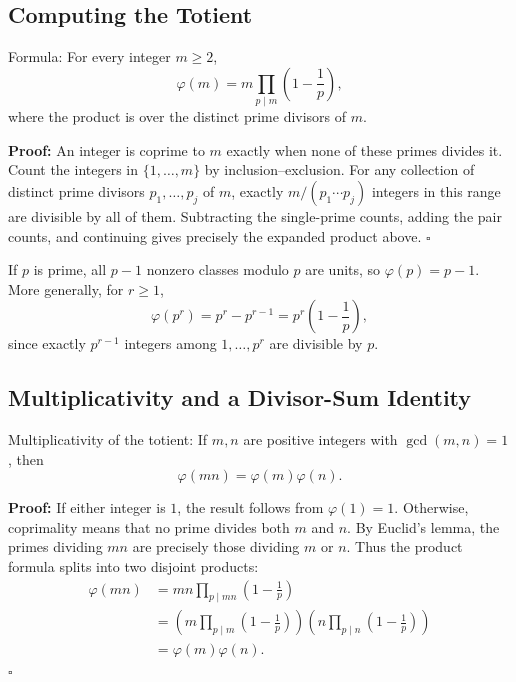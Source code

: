 \documentclass[a4paper,11pt,abstracton]{scrartcl}
\theoremstyle{dotlessP}
\theoremstyle{dotlessS}
\theoremstyle{remark}
\theoremstyle{definition}
\begin{document}
\subsection{Computing the Totient}

\begin{mainbox}{Formula:}
For every integer $m\geq2$,
\[
    \varphi(m)=m\prod_{p\mid m}\left(1-\frac1p\right),
\]
where the product is over the distinct prime divisors of $m$.
\end{mainbox}

\textbf{Proof:}
An integer is coprime to $m$ exactly when none of these primes divides
it. Count the integers in $\{1,\ldots,m\}$ by inclusion--exclusion.
For any collection of distinct prime divisors $p_1,\ldots,p_j$ of $m$,
exactly $m/(p_1\cdots p_j)$ integers in this range are divisible by
all of them. Subtracting the single-prime counts, adding the pair
counts, and continuing gives precisely the expanded product above.
\hfill$\square$

\begin{remark_box}
If $p$ is prime, all $p-1$ nonzero classes modulo $p$ are units, so
$\varphi(p)=p-1$. More generally, for $r\geq1$,
\[
    \varphi(p^r)=p^r-p^{r-1}=p^r\left(1-\frac1p\right),
\]
since exactly $p^{r-1}$ integers among $1,\ldots,p^r$ are divisible
by $p$.
\end{remark_box}


\subsection{Multiplicativity and a Divisor-Sum Identity}

\begin{mainbox}{Multiplicativity of the totient:}
If $m,n$ are positive integers with $\gcd(m,n)=1$, then
\[
    \boxed{\varphi(mn)=\varphi(m)\varphi(n).}
\]
\end{mainbox}

\textbf{Proof:}
If either integer is $1$, the result follows from $\varphi(1)=1$.
Otherwise, coprimality means that no prime divides both $m$ and $n$.
By Euclid's lemma, the primes dividing $mn$ are precisely those dividing
$m$ or $n$. Thus the product formula splits into two disjoint products:
\begin{align*}
    \varphi(mn)
    &=mn\prod_{p\mid mn}\left(1-\frac1p\right)\\
    &=\left(m\prod_{p\mid m}\left(1-\frac1p\right)\right)
      \left(n\prod_{p\mid n}\left(1-\frac1p\right)\right)\\
    &=\varphi(m)\varphi(n).
\end{align*}
\hfill$\square$
\end{document}
